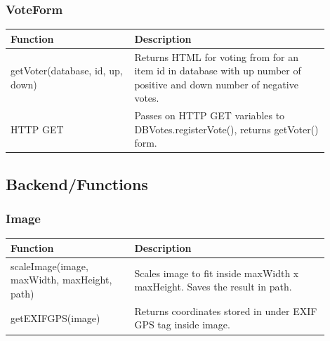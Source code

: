 \subsubsection{VoteForm}
\begin{minipage}{\linewidth}
  \centering
  \setlength{\tabcolsep}{12pt}
  \begin{tabular}{|p{0.35\linewidth}|p{0.55\linewidth}|}
  \hline
  \cellcolor{gray!25} Function & \cellcolor{gray!25} Description \\
  \hline
  getVoter(database, id, up, down) & Returns HTML for voting from for an item id in database with up number of positive and down number of negative votes. \\
  HTTP GET & Passes on HTTP GET variables to DBVotes.registerVote(), returns getVoter() form. \\
  \hline
  \end{tabular}
\end{minipage}

\subsection{Backend/Functions}
\label{subsec:CodeDetailsBackendFunctions}

\subsubsection{Image}
\begin{minipage}{\linewidth}
  \centering
  \setlength{\tabcolsep}{12pt}
  \begin{tabular}{|p{0.35\linewidth}|p{0.55\linewidth}|}
  \hline
  \cellcolor{gray!25} Function & \cellcolor{gray!25} Description \\
  \hline
  scaleImage(image, maxWidth, maxHeight, path) & Scales image to fit inside maxWidth x maxHeight. Saves the result in path. \\
  getEXIFGPS(image) & Returns coordinates stored in under EXIF GPS tag inside image. \\
  \hline
  \end{tabular}
\end{minipage}

